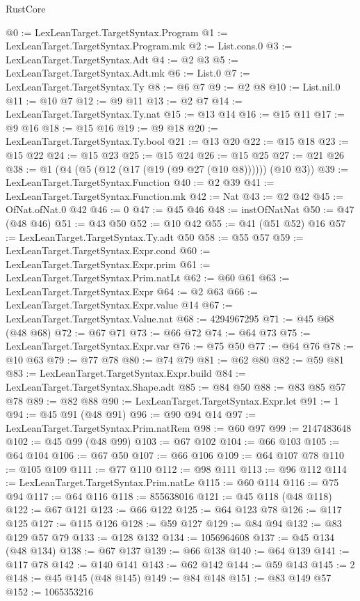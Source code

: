 \begin{lexlean}{RustCore}
\begin{coremodule}
@0 := LexLeanTarget.TargetSyntax.Program
@1 := LexLeanTarget.TargetSyntax.Program.mk
@2 := List.cons.{0}
@3 := LexLeanTarget.TargetSyntax.Adt
@4 := @2 @3
@5 := LexLeanTarget.TargetSyntax.Adt.mk
@6 := List.{0}
@7 := LexLeanTarget.TargetSyntax.Ty
@8 := @6 @7
@9 := @2 @8
@10 := List.nil.{0}
@11 := @10 @7
@12 := @9 @11
@13 := @2 @7
@14 := LexLeanTarget.TargetSyntax.Ty.nat
@15 := @13 @14
@16 := @15 @11
@17 := @9 @16
@18 := @15 @16
@19 := @9 @18
@20 := LexLeanTarget.TargetSyntax.Ty.bool
@21 := @13 @20
@22 := @15 @18
@23 := @15 @22
@24 := @15 @23
@25 := @15 @24
@26 := @15 @25
@27 := @21 @26
@38 := @1 (@4 (@5 (@12 (@17 (@19 (@9 @27 (@10 @8)))))) (@10 @3))
@39 := LexLeanTarget.TargetSyntax.Function
@40 := @2 @39
@41 := LexLeanTarget.TargetSyntax.Function.mk
@42 := Nat
@43 := @2 @42
@45 := OfNat.ofNat.{0} @42
@46 := 0
@47 := @45 @46
@48 := instOfNatNat
@50 := @47 (@48 @46)
@51 := @43 @50
@52 := @10 @42
@55 := @41 (@51 @52) @16
@57 := LexLeanTarget.TargetSyntax.Ty.adt @50
@58 := @55 @57
@59 := LexLeanTarget.TargetSyntax.Expr.cond
@60 := LexLeanTarget.TargetSyntax.Expr.prim
@61 := LexLeanTarget.TargetSyntax.Prim.natLt
@62 := @60 @61
@63 := LexLeanTarget.TargetSyntax.Expr
@64 := @2 @63
@66 := LexLeanTarget.TargetSyntax.Expr.value @14
@67 := LexLeanTarget.TargetSyntax.Value.nat
@68 := 4294967295
@71 := @45 @68 (@48 @68)
@72 := @67 @71
@73 := @66 @72
@74 := @64 @73
@75 := LexLeanTarget.TargetSyntax.Expr.var
@76 := @75 @50
@77 := @64 @76
@78 := @10 @63
@79 := @77 @78
@80 := @74 @79
@81 := @62 @80
@82 := @59 @81
@83 := LexLeanTarget.TargetSyntax.Expr.build
@84 := LexLeanTarget.TargetSyntax.Shape.adt
@85 := @84 @50
@88 := @83 @85 @57 @78
@89 := @82 @88
@90 := LexLeanTarget.TargetSyntax.Expr.let
@91 := 1
@94 := @45 @91 (@48 @91)
@96 := @90 @94 @14
@97 := LexLeanTarget.TargetSyntax.Prim.natRem
@98 := @60 @97
@99 := 2147483648
@102 := @45 @99 (@48 @99)
@103 := @67 @102
@104 := @66 @103
@105 := @64 @104
@106 := @67 @50
@107 := @66 @106
@109 := @64 @107 @78
@110 := @105 @109
@111 := @77 @110
@112 := @98 @111
@113 := @96 @112
@114 := LexLeanTarget.TargetSyntax.Prim.natLe
@115 := @60 @114
@116 := @75 @94
@117 := @64 @116
@118 := 855638016
@121 := @45 @118 (@48 @118)
@122 := @67 @121
@123 := @66 @122
@125 := @64 @123 @78
@126 := @117 @125
@127 := @115 @126
@128 := @59 @127
@129 := @84 @94
@132 := @83 @129 @57 @79
@133 := @128 @132
@134 := 1056964608
@137 := @45 @134 (@48 @134)
@138 := @67 @137
@139 := @66 @138
@140 := @64 @139
@141 := @117 @78
@142 := @140 @141
@143 := @62 @142
@144 := @59 @143
@145 := 2
@148 := @45 @145 (@48 @145)
@149 := @84 @148
@151 := @83 @149 @57
@152 := 1065353216

\end{coremodule}
\end{lexlean}
